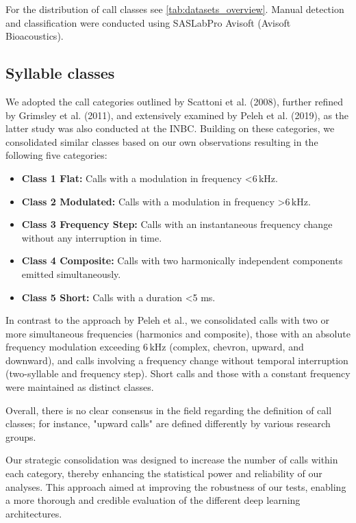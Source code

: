 \documentclass[preprint,NumberedRefs]{JASA}
\begin{document}
For the distribution of call classes see \autoref{tab:datasets_overview}. Manual detection and classification were conducted using SASLabPro Avisoft (Avisoft Bioacoustics).

\subsection{Syllable classes}
\label{sec:Syllable_classes}

We adopted the call categories outlined by Scattoni et al. (2008), further refined by Grimsley et al. (2011), and extensively examined by Peleh et al. (2019), as the latter study was also conducted at the INBC. \cite{Scattoni2008-vp,Peleh2019-ic,Grimsley2011-hx} Building on these categories, we consolidated similar classes based on our own observations resulting in the following five categories:

\begin{itemize}
    \item \textbf{Class 1 Flat:} Calls with a modulation in frequency \textless \(6\,\mathrm{kHz} \).
    \item \textbf{Class 2 Modulated:} Calls with a modulation in frequency \textgreater \(6\,\mathrm{kHz} \).
    \item \textbf{Class 3 Frequency Step:} Calls with an instantaneous frequency change without any interruption in time.
    \item \textbf{Class 4 Composite:} Calls with two harmonically independent components emitted simultaneously.
    \item \textbf{Class 5 Short:} Calls with a duration \textless 5 ms.
\end{itemize}

In contrast to the approach by Peleh et al., we consolidated calls with two or more simultaneous frequencies (harmonics and composite), those with an absolute frequency modulation exceeding \(6\,\mathrm{kHz}\) (complex, chevron, upward, and downward), and calls involving a frequency change without temporal interruption (two-syllable and frequency step). Short calls and those with a constant frequency were maintained as distinct classes.

Overall, there is no clear consensus in the field regarding the definition of call classes; for instance, "upward calls" are defined differently by various research groups. \cite{Grimsley2011-hx, Scattoni2008-vp}

Our strategic consolidation was designed to increase the number of calls within each category, thereby enhancing the statistical power and reliability of our analyses. This approach aimed at improving the robustness of our tests, enabling a more thorough and credible evaluation of the different deep learning architectures.
\end{document}
